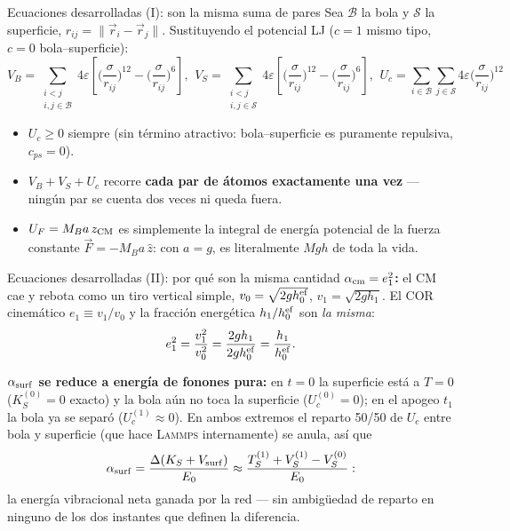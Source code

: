 \documentclass[11pt,aspectratio=169]{beamer}
\newcommand{\eps}{\varepsilon}
\newcommand{\lammps}{\textsc{Lammps}}
\begin{document}
\begin{frame}{Ecuaciones desarrolladas (I): son la misma suma de pares}
\small
Sea $\mathcal B$ la bola y $\mathcal S$ la superficie, $r_{ij}=\|\vec r_i-\vec r_j\|$.
Sustituyendo el potencial LJ ($c=1$ mismo tipo, $c=0$ bola--superficie):
\[
V_B=\!\!\sum_{\substack{i<j\\i,j\in\mathcal B}}\!\!4\eps\!\left[\Big(\frac{\sigma}{r_{ij}}\Big)^{12}\!-\Big(\frac{\sigma}{r_{ij}}\Big)^{6}\right]\!,\ \,
V_S=\!\!\sum_{\substack{i<j\\i,j\in\mathcal S}}\!\!4\eps\!\left[\Big(\frac{\sigma}{r_{ij}}\Big)^{12}\!-\Big(\frac{\sigma}{r_{ij}}\Big)^{6}\right]\!,\ \,
U_c=\!\!\sum_{i\in\mathcal B}\sum_{j\in\mathcal S}\!\!4\eps\Big(\frac{\sigma}{r_{ij}}\Big)^{12}
\]
\begin{itemize}
    \item $U_c\ge0$ siempre (sin término atractivo: bola--superficie es
    puramente repulsiva, $c_{ps}=0$).
    \item $V_B+V_S+U_c$ recorre \textbf{cada par de átomos exactamente una
    vez} --- ningún par se cuenta dos veces ni queda fuera.
    \item $U_F=M_Ba\,z_{\rm CM}$ es simplemente la integral de energía
    potencial de la fuerza constante $\vec F=-M_Ba\,\hat z$: con $a=g$,
    es literalmente $Mgh$ de toda la vida.
\end{itemize}
\end{frame}

\begin{frame}{Ecuaciones desarrolladas (II): por qué son la misma cantidad}
\small
\textbf{$\alpha_{\rm cm}=e_1^2$:} el CM cae y rebota como un tiro vertical
simple, $v_0=\sqrt{2gh_0^{\rm ef}}$, $v_1=\sqrt{2gh_1}$. El COR
cinemático $e_1\equiv v_1/v_0$ y la fracción energética
$h_1/h_0^{\rm ef}$ son \emph{la misma}:
\[
e_1^2=\frac{v_1^2}{v_0^2}=\frac{2gh_1}{2gh_0^{\rm ef}}=\frac{h_1}{h_0^{\rm ef}}.
\]

\medskip
\textbf{$\alpha_{\rm surf}$ se reduce a energía de fonones pura:} en
$t=0$ la superficie está a $T=0$ ($K_S^{(0)}=0$ exacto) y la bola aún no
toca la superficie ($U_c^{(0)}=0$); en el apogeo $t_1$ la bola ya se
separó ($U_c^{(1)}\approx0$). En ambos extremos el reparto 50/50 de
$U_c$ entre bola y superficie (que hace \lammps{} internamente) se anula,
así que
\[
\alpha_{\rm surf}=\frac{\Delta(K_S+V_{\rm surf})}{E_0}
\approx\frac{T_S^{(1)}+V_S^{(1)}-V_S^{(0)}}{E_0}:
\]
la energía vibracional neta ganada por la red --- sin ambigüedad de
reparto en ninguno de los dos instantes que definen la diferencia.
\end{frame}
\end{document}
